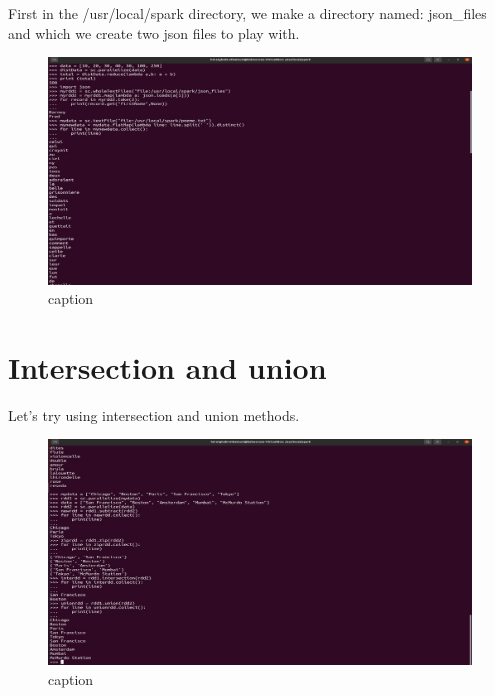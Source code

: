 \begin{spacing}{1.2}
\par First in the /usr/local/spark directory, we make a directory named: json_files and which we create two json files to play with.
\\
\begin{figure}[!htb] 
\begin{center} 
\includegraphics[width=1\linewidth]{Big_Data/Spark/Manipulating RDDs using pyspark/Working with Json.jpg} 
\end{center} 
\caption{caption} 
\end{figure} 
\FloatBarrier

\section{Intersection and union}

\par Let's try using intersection and union methods.
\\
\begin{figure}[!htb] 
\begin{center} 
\includegraphics[width=1\linewidth]{Big_Data/Spark/Manipulating RDDs using pyspark/Intersection and union.jpg} 
\end{center} 
\caption{caption} 
\end{figure} 
\FloatBarrier


\FloatBarrier

\end{spacing}